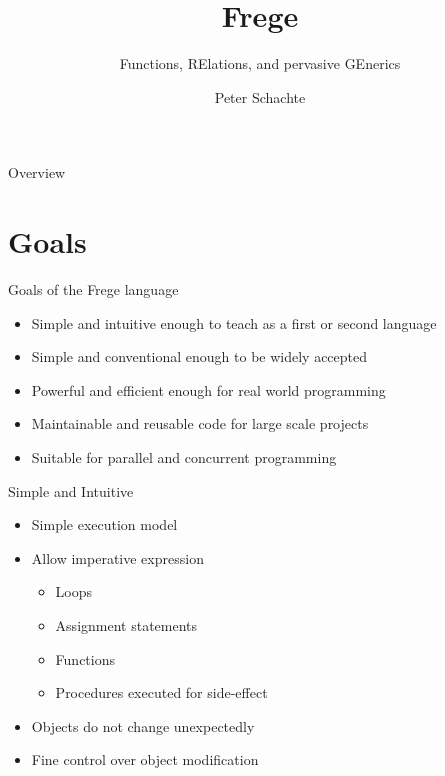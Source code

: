 \documentclass[12pt]{beamer}
\title{Frege}
\subtitle{\textsf{F}unctions, \textsf{RE}lations, and 
pervasive \textsf{GE}nerics}
\author{Peter Schachte}
\institute[Univ.\ Melbourne] %
{
  Department of Computer Science and Software Engineering \\
  University of Melbourne
}
\date{}
\newcommand{\frege}{\textsf{Frege}\xspace}
\begin{document}
\begin{frame}
  \titlepage
\end{frame}

\begin{frame}{Overview}
  \tableofcontents
\end{frame}



\section{Goals}
\begin{frame}{\LARGE Goals of the \frege language}
  \begin{itemize}
  \item Simple and intuitive enough to teach as a first or second language
  \item Simple and conventional enough to be widely accepted
  \item Powerful and efficient enough for real world programming
  \item Maintainable and reusable code for large scale projects
  \item Suitable for parallel and concurrent programming
  \end{itemize}
\end{frame}


\begin{frame}{\LARGE Simple and Intuitive}
  \begin{itemize}
  \item Simple execution model
  \item Allow imperative expression
    \begin{itemize}
    \item Loops
    \item Assignment statements
    \item Functions
    \item Procedures executed for side-effect
    \end{itemize}
  \item Objects do not change unexpectedly
  \item Fine control over object modification
  \end{itemize}
\end{frame}
\end{document}
